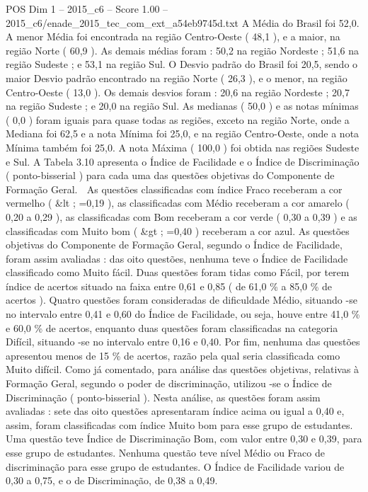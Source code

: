 \begin{textsample}{POS Dim 1 – 2015\_c6 – Score 1.00 – 2015\_c6/enade\_2015\_tec\_com\_ext\_a54eb9745d.txt}
A Média do Brasil foi 52,0.
A menor Média foi encontrada na região Centro-Oeste ( 48,1 ), e a maior, na região Norte ( 60,9 ).
As demais médias foram : 50,2 na região Nordeste ; 51,6 na região Sudeste ; e 53,1 na região Sul.
O Desvio padrão do Brasil foi 20,5, sendo o maior Desvio padrão encontrado na região Norte ( 26,3 ), e o menor, na região Centro-Oeste ( 13,0 ).
Os demais desvios foram : 20,6 na região Nordeste ; 20,7 na região Sudeste ; e 20,0 na região Sul.
As medianas ( 50,0 ) e as notas mínimas ( 0,0 ) foram iguais para quase todas as regiões, exceto na região Norte, onde a Mediana foi 62,5 e a nota Mínima foi 25,0, e na região Centro-Oeste, onde a nota Mínima também foi 25,0.
A nota Máxima ( 100,0 ) foi obtida nas regiões Sudeste e Sul.
A Tabela 3.10 apresenta o Índice de Facilidade e o Índice de Discriminação ( ponto-bisserial ) para cada uma das questões objetivas do Componente de Formação Geral.  As questões classificadas com índice Fraco receberam a cor vermelho ( \&lt ; =0,19 ), as classificadas com Médio receberam a cor amarelo ( 0,20 a 0,29 ), as classificadas com Bom receberam a cor verde ( 0,30 a 0,39 ) e as classificadas com Muito bom ( \&gt ; =0,40 ) receberam a cor azul.
As questões objetivas do Componente de Formação Geral, segundo o Índice de Facilidade, foram assim avaliadas : das oito questões, nenhuma teve o Índice de Facilidade classificado como Muito fácil.
Duas questões foram tidas como Fácil, por terem índice de acertos situado na faixa entre 0,61 e 0,85 ( de 61,0 \% a 85,0 \% de acertos ).
Quatro questões foram consideradas de dificuldade Médio, situando -se no intervalo entre 0,41 e 0,60 do Índice de Facilidade, ou seja, houve entre 41,0 \% e 60,0 \% de acertos, enquanto duas questões foram classificadas na categoria Difícil, situando -se no intervalo entre 0,16 e 0,40.
Por fim, nenhuma das questões apresentou menos de 15 \% de acertos, razão pela qual seria classificada como Muito difícil.
Como já comentado, para análise das questões objetivas, relativas à Formação Geral, segundo o poder de discriminação, utilizou -se o Índice de Discriminação ( ponto-bisserial ).
Nesta análise, as questões foram assim avaliadas : sete das oito questões apresentaram índice acima ou igual a 0,40 e, assim, foram classificadas com índice Muito bom para esse grupo de estudantes.
Uma questão teve Índice de Discriminação Bom, com valor entre 0,30 e 0,39, para esse grupo de estudantes.
Nenhuma questão teve nível Médio ou Fraco de discriminação para esse grupo de estudantes.
O Índice de Facilidade variou de 0,30 a 0,75, e o de Discriminação, de 0,38 a 0,49.

\end{textsample}

